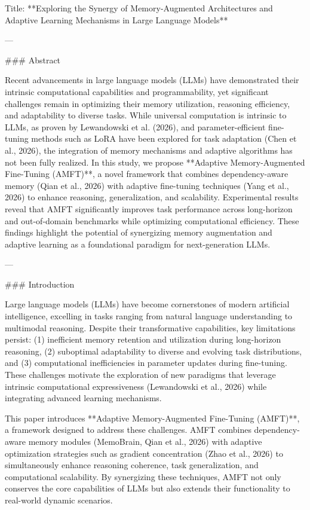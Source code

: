 Title: **Exploring the Synergy of Memory-Augmented Architectures and Adaptive Learning Mechanisms in Large Language Models**

---

### Abstract

Recent advancements in large language models (LLMs) have demonstrated their intrinsic computational capabilities and programmability, yet significant challenges remain in optimizing their memory utilization, reasoning efficiency, and adaptability to diverse tasks. While universal computation is intrinsic to LLMs, as proven by Lewandowski et al. (2026), and parameter-efficient fine-tuning methods such as LoRA have been explored for task adaptation (Chen et al., 2026), the integration of memory mechanisms and adaptive algorithms has not been fully realized. In this study, we propose **Adaptive Memory-Augmented Fine-Tuning (AMFT)**, a novel framework that combines dependency-aware memory (Qian et al., 2026) with adaptive fine-tuning techniques (Yang et al., 2026) to enhance reasoning, generalization, and scalability. Experimental results reveal that AMFT significantly improves task performance across long-horizon and out-of-domain benchmarks while optimizing computational efficiency. These findings highlight the potential of synergizing memory augmentation and adaptive learning as a foundational paradigm for next-generation LLMs.

---

### Introduction

Large language models (LLMs) have become cornerstones of modern artificial intelligence, excelling in tasks ranging from natural language understanding to multimodal reasoning. Despite their transformative capabilities, key limitations persist: (1) inefficient memory retention and utilization during long-horizon reasoning, (2) suboptimal adaptability to diverse and evolving task distributions, and (3) computational inefficiencies in parameter updates during fine-tuning. These challenges motivate the exploration of new paradigms that leverage intrinsic computational expressiveness (Lewandowski et al., 2026) while integrating advanced learning mechanisms.

This paper introduces **Adaptive Memory-Augmented Fine-Tuning (AMFT)**, a framework designed to address these challenges. AMFT combines dependency-aware memory modules (MemoBrain, Qian et al., 2026) with adaptive optimization strategies such as gradient concentration (Zhao et al., 2026) to simultaneously enhance reasoning coherence, task generalization, and computational scalability. By synergizing these techniques, AMFT not only conserves the core capabilities of LLMs but also extends their functionality to real-world dynamic scenarios.

